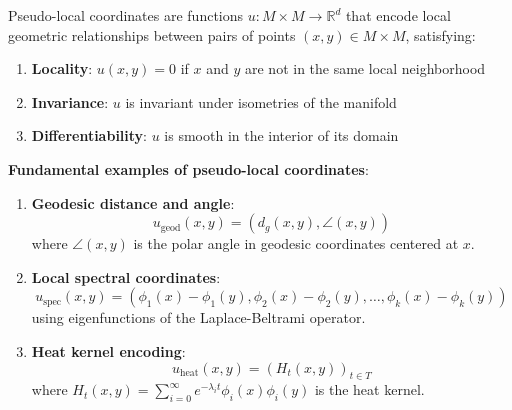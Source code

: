 \begin{definition}\label{def:coordenadas_pseudo_locales}
Pseudo-local coordinates are functions $u: M \times M \to \mathbb{R}^d$ that encode local geometric relationships between pairs of points $(x, y) \in M \times M$, satisfying:
\begin{enumerate}
    \item \textbf{Locality}: $u(x, y) = 0$ if $x$ and $y$ are not in the same local neighborhood
    \item \textbf{Invariance}: $u$ is invariant under isometries of the manifold
    \item \textbf{Differentiability}: $u$ is smooth in the interior of its domain
\end{enumerate}
\end{definition}

\textbf{Fundamental examples of pseudo-local coordinates}:

\begin{enumerate}
    \item \textbf{Geodesic distance and angle}:
    \begin{equation}
    u_{\text{geod}}(x, y) = (d_g(x, y), \angle(x, y))
    \end{equation}
    where $\angle(x, y)$ is the polar angle in geodesic coordinates centered at $x$.

    \item \textbf{Local spectral coordinates}:
    \begin{equation}
    u_{\text{spec}}(x, y) = (\phi_1(x) - \phi_1(y), \phi_2(x) - \phi_2(y), \ldots, \phi_k(x) - \phi_k(y))
    \end{equation}
    using eigenfunctions of the Laplace-Beltrami operator.

    \item \textbf{Heat kernel encoding}:
    \begin{equation}
    u_{\text{heat}}(x, y) = (H_t(x, y))_{t \in T}
    \end{equation}
    where $H_t(x, y) = \sum_{i=0}^{\infty} e^{-\lambda_i t} \phi_i(x) \phi_i(y)$ is the heat kernel.
\end{enumerate}

